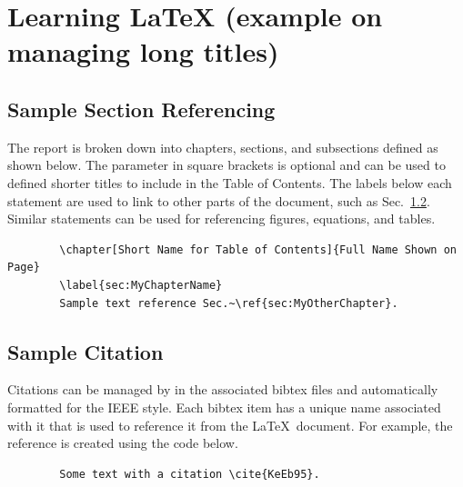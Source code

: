 
\chapter[Learning LaTeX]{Learning LaTeX (example on managing long titles)}
\label{sec:literature}

\section{Sample Section Referencing}
\label{sec:intro:second:section}

The report is broken down into chapters, sections, and subsections defined as shown below. The parameter in square brackets is optional and can be used to defined shorter titles to include in the Table of Contents. The labels below each statement are used to link to other parts of the document, such as Sec.~\ref{sec:intro:second:cite}. Similar statements can be used for referencing figures, equations, and tables.
	\begin{verbatim}
		\chapter[Short Name for Table of Contents]{Full Name Shown on Page}
		\label{sec:MyChapterName}
		Sample text reference Sec.~\ref{sec:MyOtherChapter}.
	\end{verbatim}
	\vfill

\section{Sample Citation}
\label{sec:intro:second:cite}
Citations can be managed by in the associated bibtex files and automatically formatted for the IEEE style. Each bibtex item has a unique name associated with it that is used to reference it from the \LaTeX~document. For example, the reference \cite{KeEb95} is created using the code below. 
	\begin{verbatim}
		Some text with a citation \cite{KeEb95}.
	\end{verbatim}

